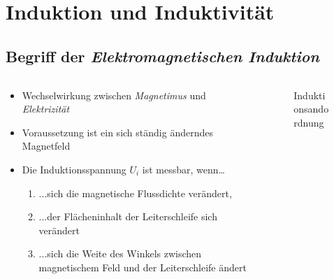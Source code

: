 \section{Induktion und Induktivität}
\subsection{Begriff der \textit{Elektromagnetischen Induktion}}
\begin{frame}
    \makeframetitle

    \begin{columns}
        \begin{column}{0.65\textwidth}
            \begin{itemize}
                \item \alert{Wechselwirkung} zwischen
                    \textit{Magnetimus} und \textit{Elektrizität}
                \item Voraussetzung ist ein sich ständig \alert{änderndes}
                    Magnetfeld
                \item Die Induktionsspannung $U_i$ ist messbar, wenn\dots
                    \begin{enumerate}
                        \item ...sich die magnetische Flussdichte \alert{verändert},
                        \item ...der Flächeninhalt der Leiterschleife
                            sich \alert{verändert}
                        \item ...sich die Weite des Winkels
                            zwischen magnetischem Feld und der Leiterschleife
                            \alert{ändert}
                    \end{enumerate}
            \end{itemize}
        \end{column}
        \begin{column}{0.35\textwidth}
        \begin{figure}
            \centering
            \caption{Induktionsandordnung \cite{leifi_induktions_anordnung}}
        \end{figure}
        \end{column}
    \end{columns}
\end{frame}

